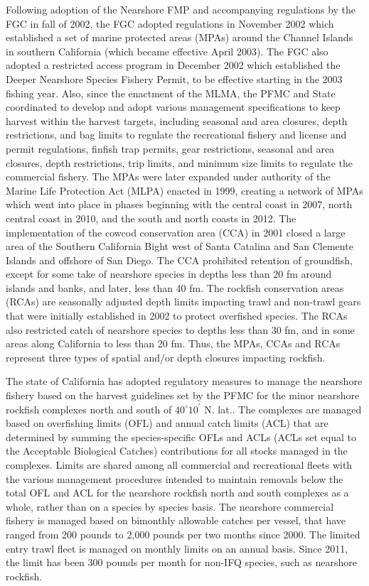 \documentclass[11pt,
  english,
  letterpaper,
]{article}
\begin{document}
Following adoption of the Nearshore FMP and accompanying regulations by the FGC in fall of 2002, the FGC adopted regulations in November 2002 which established a set of marine protected areas (MPAs) around the Channel Islands in southern California (which became effective April 2003). The FGC also adopted a restricted access program in December 2002 which established the Deeper Nearshore Species Fishery Permit, to be effective starting in the 2003 fishing year. Also, since the enactment of the MLMA, the PFMC and State coordinated to develop and adopt various management specifications to keep harvest within the harvest targets, including seasonal and area closures, depth restrictions, and bag limits to regulate the recreational fishery and license and permit regulations, finfish trap permits, gear restrictions, seasonal and area closures, depth restrictions, trip limits, and minimum size limits to regulate the commercial fishery. The MPAs were later expanded under authority of the Marine Life Protection Act (MLPA) enacted in 1999, creating a network of MPAs which went into place in phases beginning with the central coast in 2007, north central coast in 2010, and the south and north coasts in 2012. The implementation of the cowcod conservation area (CCA) in 2001 closed a large area of the Southern California Bight west of Santa Catalina and San Clemente Islands and offshore of San Diego. The CCA prohibited retention of groundfish, except for some take of nearshore species in depths less than 20 fm around islands and banks, and later, less than 40 fm. The rockfish conservation areas (RCAs) are seasonally adjusted depth limits impacting trawl and non-trawl gears that were initially established in 2002 to protect overfished species. The RCAs also restricted catch of nearshore species to depths less than 30 fm, and in some areas along California to less than 20 fm. Thus, the MPAs, CCAs and RCAs represent three types of spatial and/or depth closures impacting rockfish.

The state of California has adopted regulatory measures to manage the nearshore fishery based on the harvest guidelines set by the PFMC for the minor nearshore rockfish complexes north and south of $40^\circ 10^\prime$ N. lat.. The complexes are managed based on overfishing limits (OFL) and annual catch limits (ACL) that are determined by summing the species-specific OFLs and ACLs (ACLs set equal to the Acceptable Biological Catches) contributions for all stocks managed in the complexes. Limits are shared among all commercial and recreational fleets with the various management procedures intended to maintain removals below the total OFL and ACL for the nearshore rockfish north and south complexes as a whole, rather than on a species by species basis. The nearshore commercial fishery is managed based on bimonthly allowable catches per vessel, that have ranged from 200 pounds to 2,000 pounds per two months since 2000. The limited entry trawl fleet is managed on monthly limits on an annual basis. Since 2011, the limit has been 300 pounds per month for non-IFQ species, such as nearshore rockfish.
\end{document}
